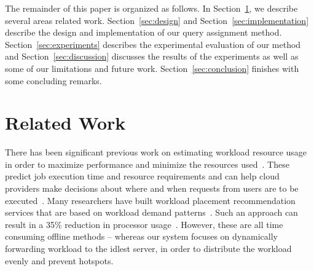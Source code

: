 The remainder of this paper is organized as follows. In Section~\ref{sec:relWork}, we describe several areas related work. Section~\ref{sec:design} and Section~\ref{sec:implementation} describe the design and implementation of our query assignment method. Section~\ref{sec:experiments} describes the experimental evaluation of our method and Section~\ref{sec:discussion} discusses the results of the experiments as well as some of our limitations and future work. Section~\ref{sec:conclusion} finishes with some concluding remarks.

\section{Related Work}
\label{sec:relWork}

There has been significant previous work on estimating workload resource usage in order to maximize performance and minimize the resources used~\cite{citeulike:6656217,5452742,curino2011relational, MIT-Relational}. These predict job execution time and resource requirements and can help cloud providers make decisions about where and when requests from users are to be executed~\cite{citeulike:6656217}. Many researchers have built workload placement recommendation services that are based on workload demand patterns~\cite{Gmach:2007:WAD:1524302.1524818, Atikoglu:2012:WAL:2254756.2254766}. Such an approach can result in a 35\% reduction in processor usage~\cite{Gmach:2007:WAD:1524302.1524818}. However, these are all time consuming offline methods -- whereas our system focuses on dynamically forwarding workload to the idlest server, in order to distribute the workload evenly and prevent hotspots.
 

